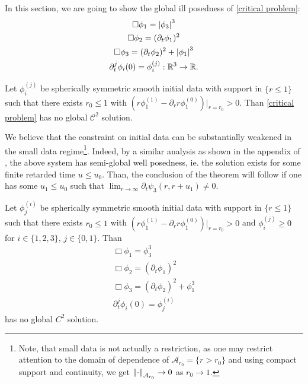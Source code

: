 \documentclass[11pt, oneside]{amsart}
\begin{document}
	In this section, we are going to show the global ill posedness of \cref{critical problem}:
	\begin{equation*}
		\begin{gathered}
			\Box\phi_1=\left\lvert \phi_3\right\rvert^3\\
			\Box\phi_2=(\partial_t\phi_1)^2\\
			\Box\phi_3=(\partial_t\phi_2)^2+\left\lvert \phi_1\right\rvert^3\\
			\partial_t^j\phi_i(0)=\phi_i^{(j)}:\mathbb{R}^3\to\mathbb{R}.
		\end{gathered}
	\end{equation*}	
	\begin{theorem}\label{critical eq}
		Let $\phi_i^{(j)}$ be spherically symmetric smooth initial data with support in $\{r\leq1\}$ such that there exists $r_0\leq1$ with $(r\phi^{(1)}_1-\partial_r r\phi^{(0)}_1)|_{r=r_0}>0$.
		Than \cref{critical problem} has no global $\mathcal{C}^2$ solution.
	\end{theorem}
	\begin{remark}
		We believe that the constraint on initial data can be substantially weakened in the small data regime\footnote{Note, that small data is not actually a restriction, as one may restrict attention to the domain of dependence of $\mathcal{A}_{r_0}=\{r>r_0\}$ and using compact support and continuity, we get $\left\lVert \cdot\right\rVert_{\mathcal{A}_{r_0}}\to0$ as $r_0\to1$. }. Indeed, by a similar analysis as shown in the appendix of \cite{keir_weak_2018}, the above system has semi-global well posedness, ie. the solution exists for some finite retarded time $u\leq u_0$. Than, the conclusion of the theorem will follow if one has some $u_1\leq u_0$ such that $\lim_{r\to\infty}\partial_t\psi_3(r,r+u_1)\neq 0$.
	\end{remark}
	\begin{corollary}\label{failure of weak null condition}
		Let $\phi_j^{(i)}$ be spherically symmetric smooth initial data with support in $\{r\leq1\}$ such that there exists $r_0\leq1$ with $(r\phi^{(1)}_1-\partial_r r\phi^{(0)}_1)|_{r=r_0}>0$ and $\phi^{(j)}_i\geq0$ for $i\in\{1,2,3\},\,j\in\{0,1\}$. Than
		\begin{equation}\label{critical problem without abs}
			\begin{gathered}
				\Box\phi_1=\phi_3^3\\
				\Box\phi_2=(\partial_t\phi_1)^2\\
				\Box\phi_3=(\partial_t\phi_2)^2+\phi_1^3\\
				\partial_t^j\phi_i(0)=\phi_j^{(i)}
			\end{gathered}
		\end{equation}
		has no global $C^2$ solution.
	\end{corollary}
\end{document}
